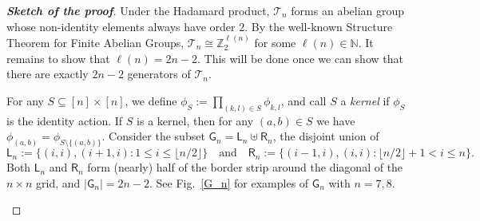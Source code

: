 \documentclass[11pt,reqno]{amsart}
\numberwithin{equation}{section}
\def\blue{\textcolor{blue}}
\def\red{\textcolor{red}}
\theoremstyle{plain}
\theoremstyle{definition}
\newcommand{\N}{\mathbb{N}}
\newcommand{\Z}{\mathbb{Z}}
\begin{document}
\begin{proof}[{\bf Sketch of the proof}]
Under the Hadamard product, $\mathcal{T}_n$ forms an abelian group whose non-identity elements
always have order $2$. By the well-known Structure Theorem for Finite Abelian Groups,   $\mathcal{T}_n\cong\Z_2^{\ell(n)}$ for some $\ell(n)\in\N$. It remains to show that $\ell(n)=2n-2$. This will be done once we can show that there are exactly $2n-2$ generators of $\mathcal{T}_n$.

For any $S\subseteq[n]\times[n]$, we define $\phi_S:=\prod_{(k,l)\in S}\phi_{k,l}$,
and call  $S$ a {\em kernel} if $\phi_S$ is the identity action. If $S$ is a kernel, then for any $(a,b)\in S$ we have $\phi_{(a,b)}=\phi_{S\setminus\{(a,b)\}}$. Consider the subset $\mathsf{G}_n=\mathsf{L}_n\uplus \mathsf{R}_n$, the disjoint union of
$$
\mathsf{L}_n:=\{(i,i), (i+1,i): 1\leq i\leq \lfloor n/2\rfloor\}\quad\text{and}\quad \mathsf{R}_n:=\{(i-1,i), (i,i): \lfloor n/2\rfloor+1<i\leq n\}.
$$
  Both $\mathsf{L}_n$ and $\mathsf{R}_n$ form (nearly) half of the border strip around the diagonal of the $n\times n$ grid, and $|\mathsf{G}_n|=2n-2$.
See Fig.~\ref{G_n} for examples of $\mathsf{G}_n$ with $n=7,8$.

\begin{figure}[ht]
\begin{center}
\end{center}
\end{figure}
\end{proof}
\end{document}
